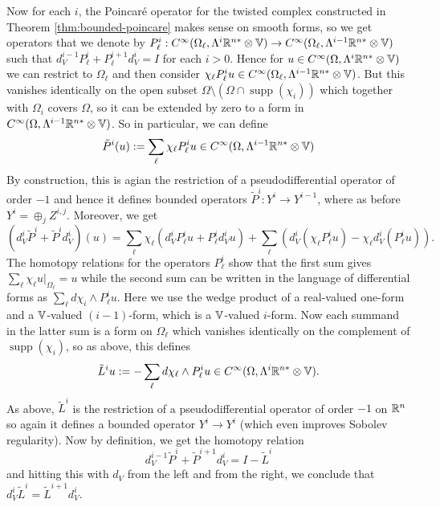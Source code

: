 \documentclass[11pt]{amsart}
\newcommand{\0}{\mathaccent23}
\newcommand\supp{\operatorname{supp}}
\begin{document}
Now for each $i$, the Poincar\'e operator for the twisted complex constructed in Theorem \ref{thm:bounded-poincare} makes sense on smooth forms, so we get operators that we denote by $P^i_\ell: C^\infty(\Omega_\ell,\Lambda^i\Bbb R^{n*}\otimes\Bbb V)\to C^\infty(\Omega_\ell,\Lambda^{i-1}\Bbb R^{n*}\otimes\Bbb V)$ such that $d^{i-1}_VP^i_\ell+P^{i+1}_\ell d^i_V=I$ for each $i>0$. Hence for $u\in C^\infty(\Omega,\Lambda^i\Bbb R^{n*}\otimes\Bbb V)$ we can restrict to $\Omega_\ell$ and then consider $\chi_\ell P^i_\ell u\in C^\infty(\Omega_\ell,\Lambda^{i-1}\Bbb R^{n*}\otimes\Bbb V)$. But this vanishes identically on the open subset $\Omega\setminus(\Omega\cap \supp(\chi_i))$ which together with $\Omega_i$ covers $\Omega$, so it can be extended by zero to a form in $C^\infty(\Omega,\Lambda^{i-1}\Bbb R^{n*}\otimes\Bbb V)$. So in particular, we can define
\begin{equation}\label{tP-Lip-def}
  \tilde P^i(u):=\sum_\ell\chi_\ell P^i_\ell u\in C^\infty(\Omega,\Lambda^{i-1}\Bbb R^{n*}\otimes\Bbb V)
\end{equation}
By construction, this is agian the restriction of a pseudodifferential operator of order $-1$ and hence it defines bounded operators $\tilde P^i:Y^i\to Y^{i-1}$, where as before $Y^i=\oplus_jZ^{i,j}$. Moreover, we get 
$$
(d^i_V\tilde P^i+\tilde P^id^i_V)(u)=\textstyle\sum_\ell\chi_\ell(d^i_VP^i_\ell u+P^i_\ell d^i_Vu)+\sum_\ell(d^i_V(\chi_\ell P^i_\ell u)-\chi_\ell d^i_V(P^i_\ell u)).  
$$
The homotopy relations for the operators $P^i_\ell$ show that the first sum gives $\sum_\ell\chi_\ell u|_{\Omega_\ell}=u$ while the second sum can be written in the language of differential forms as $\sum_\ell d\chi_i\wedge P^i_\ell u$. Here we use the wedge product of a real-valued one-form and a $\Bbb V$-valued $(i-1)$-form, which is a $\Bbb V$-valued $i$-form. Now each summand in the latter sum is a form on $\Omega_\ell$ which vanishes identically on the complement of $\supp(\chi_i)$, so as above, this defines
\begin{equation}\label{tK-Lip-def}
  \tilde L^i u:=-\sum_\ell d\chi_\ell\wedge P^i_\ell u\in C^\infty(\Omega,\Lambda^i\Bbb R^{n*}\otimes\Bbb V).
\end{equation}
As above, $\tilde L^i$ is the restriction of a pseudodifferential operator of order $-1$ on $\Bbb R^n$ so again it defines a bounded operator $Y^i\to Y^i$ (which even improves Sobolev regularity). Now by definition, we  get the homotopy relation
\begin{equation}\label{tP-tK-homot}
  d^{i-1}_V\tilde P^i+\tilde P^{i+1}d_V^i=I-\tilde L^i
\end{equation}
and hitting this with $d_V$ from the left and from the right, we conclude that $d^i_V\tilde L^i=\tilde L^{i+1}d^i_V$.   
\end{document}
